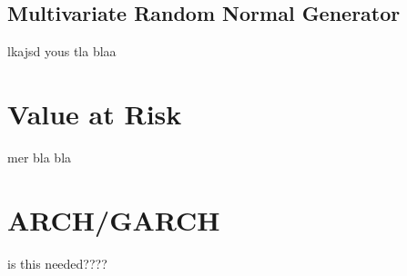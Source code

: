 
\subsection{Multivariate Random Normal Generator}
lkajsd yous tla blaa 
\section{Value at Risk}
mer bla bla
\section{ARCH/GARCH}%
is this needed????
